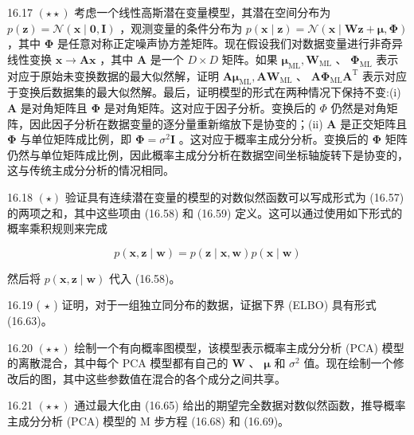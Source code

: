 \documentclass[10pt]{report}
\begin{document}
16.17 \(\left( {\star  \star  }\right)\) 考虑一个线性高斯潜在变量模型，其潜在空间分布为 \(p\left( \mathbf{z}\right)  = \mathcal{N}\left( {\mathbf{x} \mid  \mathbf{0},\mathbf{I}}\right)\) ，观测变量的条件分布为 \(p\left( {\mathbf{x} \mid  \mathbf{z}}\right)  = \mathcal{N}\left( {\mathbf{x} \mid  \mathbf{W}\mathbf{z} + \mathbf{\mu },\mathbf{\Phi }}\right)\) ，其中 \(\mathbf{\Phi }\) 是任意对称正定噪声协方差矩阵。现在假设我们对数据变量进行非奇异线性变换 \(\mathbf{x} \rightarrow  \mathbf{A}\mathbf{x}\) ，其中 \(\mathbf{A}\) 是一个 \(D \times  D\) 矩阵。如果 \({\mathbf{\mu }}_{\mathrm{{ML}}},{\mathbf{W}}_{\mathrm{{ML}}}\) 、 \({\mathbf{\Phi }}_{\mathrm{{ML}}}\) 表示对应于原始未变换数据的最大似然解，证明 \(\mathbf{A}{\mathbf{\mu }}_{\mathrm{{ML}}},\mathbf{A}{\mathbf{W}}_{\mathrm{{ML}}}\) 、 \(\mathbf{A}{\mathbf{\Phi }}_{\mathrm{{ML}}}{\mathbf{A}}^{\mathrm{T}}\) 表示对应于变换后数据集的最大似然解。最后，证明模型的形式在两种情况下保持不变:(i) \(\mathbf{A}\) 是对角矩阵且 \(\mathbf{\Phi }\) 是对角矩阵。这对应于因子分析。变换后的 \(\Phi\) 仍然是对角矩阵，因此因子分析在数据变量的逐分量重新缩放下是协变的；(ii) \(\mathbf{A}\) 是正交矩阵且 \(\mathbf{\Phi }\) 与单位矩阵成比例，即 \(\mathbf{\Phi } = {\sigma }^{2}\mathbf{I}\) 。这对应于概率主成分分析。变换后的 \(\mathbf{\Phi }\) 矩阵仍然与单位矩阵成比例，因此概率主成分分析在数据空间坐标轴旋转下是协变的，这与传统主成分分析的情况相同。

16.18 \(\left( \star \right)\) 验证具有连续潜在变量的模型的对数似然函数可以写成形式为 (16.57) 的两项之和，其中这些项由 (16.58) 和 (16.59) 定义。这可以通过使用如下形式的概率乘积规则来完成

\[
p\left( {\mathbf{x},\mathbf{z} \mid  \mathbf{w}}\right)  = p\left( {\mathbf{z} \mid  \mathbf{x},\mathbf{w}}\right) p\left( {\mathbf{x} \mid  \mathbf{w}}\right)  \tag{16.89}
\]

然后将 \(p\left( {\mathbf{x},\mathbf{z} \mid  \mathbf{w}}\right)\) 代入 (16.58)。

16.19 ( \(\star\) ) 证明，对于一组独立同分布的数据，证据下界 (ELBO) 具有形式 (16.63)。

16.20 \(\left( {\star  \star  }\right)\) 绘制一个有向概率图模型，该模型表示概率主成分分析 (PCA) 模型的离散混合，其中每个 PCA 模型都有自己的 \(\mathbf{W}\) 、 \(\mathbf{\mu }\) 和 \({\sigma }^{2}\) 值。现在绘制一个修改后的图，其中这些参数值在混合的各个成分之间共享。

16.21 \(\left( {\star  \star  }\right)\) 通过最大化由 (16.65) 给出的期望完全数据对数似然函数，推导概率主成分分析 (PCA) 模型的 M 步方程 (16.68) 和 (16.69)。
\end{document}
